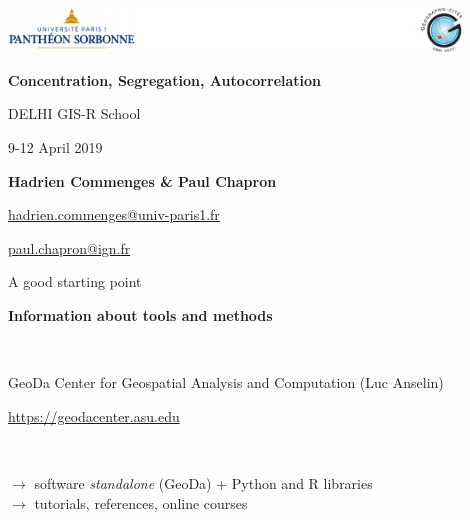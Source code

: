 \graphicspath{{IMAGE/}}

\begin{frame}

\includegraphics[width=12cm]{Logos.pdf}

\vfill

\begin{center}

\vspace*{1cm}

\LARGE
\textbf{Concentration, Segregation, Autocorrelation}

\vspace*{1cm}
 DELHI GIS-R School


\large
9-12 April 2019

\vspace*{1cm}


\textbf{Hadrien Commenges \& Paul Chapron}

{\small

\vspace*{0.1cm}

\url{hadrien.commenges@univ-paris1.fr}

\url{paul.chapron@ign.fr}
}

\end{center}

\end{frame}

\begin{frame}{A good starting point}

\textbf{Information about tools and methods }

~

GeoDa Center for Geospatial Analysis and Computation (Luc Anselin)

\url{https://geodacenter.asu.edu}

~

$\rightarrow$ software \emph{standalone} (GeoDa) + Python and  R libraries \\
$\rightarrow$ tutorials, references, online courses


\end{frame}


